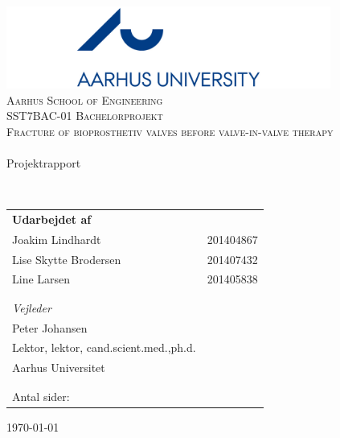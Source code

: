 \begin{titlingpage}
\begin{center}

~ \\[2.0cm]

\includegraphics[width=0.8\textwidth]{Figure/Ase} ~\\[0.5cm]

\textsc{\LARGE Aarhus School of Engineering}\\[0.5cm]

\textsc{\Large SST7BAC-01 Bachelorprojekt} ~\\[1.0cm]

\textsc{\Large Fracture of bioprosthetiv valves before valve-in-valve therapy}\\


\noindent\makebox[\linewidth]{\rule{\textwidth}{0.4pt}}\\
[0.5cm]{\Huge Projektrapport}
\noindent\makebox[\linewidth]{\rule{\textwidth}{0.4pt}}

\end{center}
~ \\[0.5cm]



\begin{table}[H]
\begin{tabular}{ll}
\textbf{Udarbejdet af} & \\
Joakim Lindhardt & 201404867\\
Lise Skytte Brodersen  & 201407432 \\
Line Larsen & 201405838 \\

\\ \\
\textit{Vejleder} & \\
Peter Johansen & \\
Lektor, lektor, cand.scient.med.,ph.d. & \\
Aarhus Universitet & \\[1ex]
\\ \\
Antal sider: \pageref{LastPage} & \\
\end{tabular}
\end{table}
		

\vfill

\begin{center}
{\large \today}

\end{center}


\end{titlingpage}
